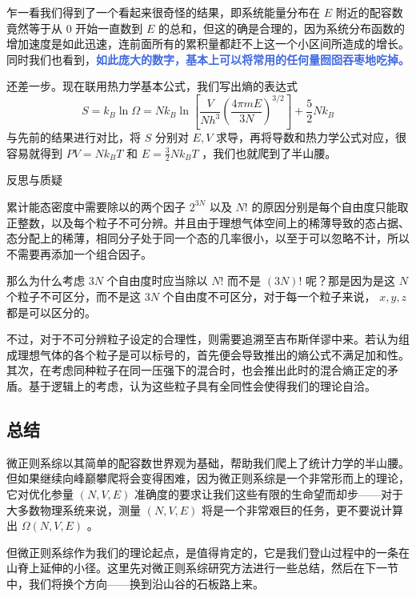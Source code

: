 \documentclass[hyperref,UTF-8]{ctexart}
\newcommand{\0}{\boldsymbol{0}}
\begin{document}
乍一看我们得到了一个看起来很奇怪的结果，即系统能量分布在 $E$ 附近的配容数竟然等于从 $0$ 开始一直数到 $E$ 的总和，但这的确是合理的，因为系统分布函数的增加速度是如此迅速，连前面所有的累积量都赶不上这一个小区间所造成的增长。同时我们也看到，\textcolor{RoyalBlue}{\textbf{\kaishu 如此庞大的数字，基本上可以将常用的任何量囫囵吞枣地吃掉。}} 

还差一步。现在联用热力学基本公式，我们写出熵的表达式
\[
    S = k_B\ln \Omega = Nk_B \ln\left[ \frac{V}{N h^3} \left(\frac{4\pi mE}{3N} \right)^{3/2}  \right] + \frac{5}{2} N k_B
\]
与先前的结果进行对比，将 $S$ 分别对 $E,V$ 求导，再将导数和热力学公式对应，很容易就得到 $PV = Nk_B T$ 和 $E = \frac{3}{2}N k_BT$ ，我们也就爬到了半山腰。

\begin{justification}{\kaishu 反思与质疑}
    \kaishu \fontsize{11pt}{16pt}
    
    \quad\quad 累计能态密度中需要除以的两个因子 $2^{3N}$ 以及 $N!$ 的原因分别是每个自由度只能取正整数，以及每个粒子不可分辨。并且由于理想气体空间上的稀薄导致的态占据、态分配上的稀薄，相同分子处于同一个态的几率很小，以至于可以忽略不计，所以不需要再添加一个组合因子。

    \quad\quad 那么为什么考虑 $3N$ 个自由度时应当除以 $N!$ 而不是 $(3N)!$ 呢？那是因为是这 $N$ 个粒子不可区分，而不是这 $3N$ 个自由度不可区分，对于每一个粒子来说， $x, y, z$ 都是可以区分的。

    \quad\quad 不过，对于不可分辨粒子设定的合理性，则需要追溯至吉布斯佯谬中来。若认为组成理想气体的各个粒子是可以标号的，首先便会导致推出的熵公式不满足加和性。其次，在考虑同种粒子在同一压强下的混合时，也会推出此时的混合熵正定的矛盾\cite{Pathria}。基于逻辑上的考虑，认为这些粒子具有全同性会使得我们的理论自洽。
\end{justification}

\subsection{总结}

微正则系综以其简单的配容数世界观为基础，帮助我们爬上了统计力学的半山腰。但如果继续向峰巅攀爬将会变得困难，因为微正则系综是一个非常形而上的理论，它对优化参量 $(N,V,E)$ 准确度的要求让我们这些有限的生命望而却步——对于大多数物理系统来说，测量 $(N,V,E)$ 将是一个非常艰巨的任务，更不要说计算出 $\Omega(N,V,E)$ 。

但微正则系综作为我们的理论起点，是值得肯定的，它是我们登山过程中的一条在山脊上延伸的小径。这里先对微正则系综研究方法进行一些总结，然后在下一节中，我们将换个方向——换到沿山谷的石板路上来。
\end{document}

